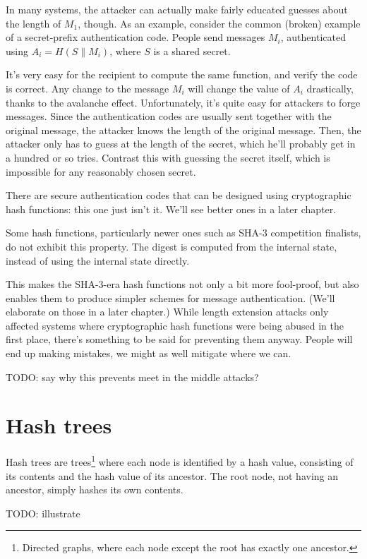 \documentclass[11pt,ebook,table,dvipsnames]{memoir}
\begin{document}
In many systems, the attacker can actually make fairly educated
guesses about the length of $M_1$, though. As an example, consider
the common (broken) example of a secret-prefix authentication code.
People send messages $M_i$, authenticated using $A_i = H(S \| M_i)$,
where $S$ is a shared secret.

It's very easy for the recipient to compute the same function, and
verify the code is correct. Any change to the message $M_i$ will
change the value of $A_i$ drastically, thanks to the avalanche effect.
Unfortunately, it's quite easy for attackers to forge messages. Since
the authentication codes are usually sent together with the original
message, the attacker knows the length of the original message. Then,
the attacker only has to guess at the length of the secret, which
he'll probably get in a hundred or so tries. Contrast this with
guessing the secret itself, which is impossible for any reasonably
chosen secret.

There are secure authentication codes that can be designed using
cryptographic hash functions: this one just isn't it. We'll see
better ones in a later chapter.

Some hash functions, particularly newer ones such as SHA-3 competition
finalists, do not exhibit this property. The digest is computed from
the internal state, instead of using the internal state directly.

This makes the SHA-3-era hash functions not only a bit more
fool-proof, but also enables them to produce simpler schemes for
message authentication. (We'll elaborate on those in a later chapter.)
While length extension attacks only affected systems where
cryptographic hash functions were being abused in the first place,
there's something to be said for preventing them anyway. People will
end up making mistakes, we might as well mitigate where we can.

TODO: say why this prevents meet in the middle attacks?
\section{Hash trees}
\label{sec-2-6-9}

Hash trees are trees\footnote{Directed graphs, where each node except the
root has exactly one ancestor.} where each node is identified by a
hash value, consisting of its contents and the hash value of its
ancestor. The root node, not having an ancestor, simply hashes its own
contents.

TODO: illustrate
\end{document}
